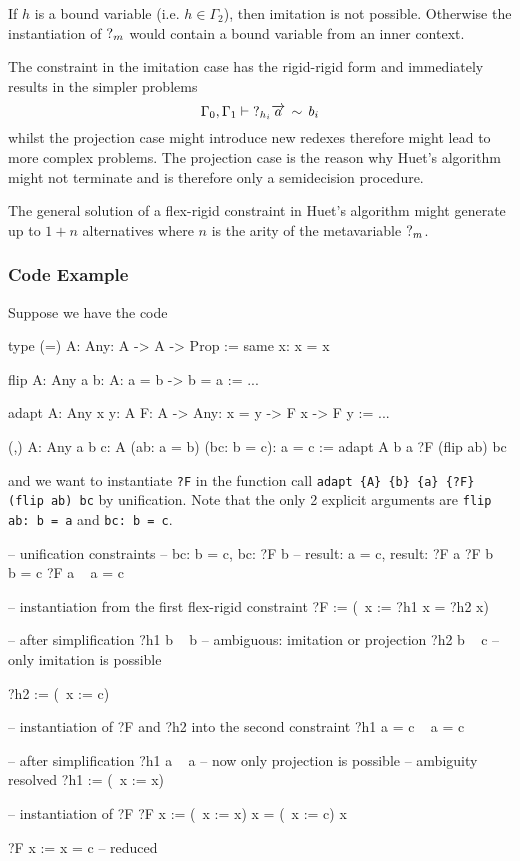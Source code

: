 If $h$ is a bound variable (i.e. $h\in \Gamma_2$), then imitation is not
possible. Otherwise the instantiation of ${?_{m}}$ would contain a bound
variable from an inner context.

The constraint in the imitation case has the rigid-rigid form and immediately
results in the simpler problems
$$
    \Gamma_0, \Gamma_1 \vdash {?_{h_i}} {\overrightarrow {a}} \, \sim \, b_i
$$
whilst the projection case might introduce new redexes therefore might lead to
more complex problems. The projection case is the reason why Huet's algorithm
might not terminate and is therefore only a semidecision procedure.

The general solution of a flex-rigid constraint in Huet's algorithm might
generate up to $1 + n$ alternatives where $n$ is the arity of the metavariable
${?_{m}}$.






\subsubsection{Code Example}

Suppose we have the code
\begin{alba}
    type (=) {A: Any}: A -> A -> Prop :=
        same {x}: x = x

    flip {A: Any} {a b: A}: a = b -> b = a :=
        ...

    adapt {A: Any} {x y: A} {F: A -> Any}: x = y -> F x -> F y :=
        ...

    (,) {A: Any} {a b c: A} (ab: a = b) (bc: b = c): a = c :=
        adapt {A} {b} {a} {?F} (flip ab) bc
\end{alba}
%
and we want to instantiate {\tt ?F} in the function call
{\tt adapt \{A\} \{b\} \{a\} \{?F\} (flip ab) bc}
by unification. Note that the only 2 explicit arguments are
{\tt flip ab: b = a} and {\tt bc: b = c}.

\begin{alba}
    -- unification constraints
    --    bc: b = c,      bc: ?F b
    --    result: a = c,  result: ?F a
    ?F b   ~   b = c
    ?F a   ~   a = c

    -- instantiation from the first flex-rigid constraint
    ?F := (\ x := ?h1 x = ?h2 x)

    -- after simplification
    ?h1 b  ~  b             -- ambiguous: imitation or projection
    ?h2 b  ~  c             -- only imitation is possible

    ?h2 := (\ x := c)

    -- instantiation of ?F and ?h2 into the second constraint
    ?h1 a = c    ~    a = c

    -- after simplification
    ?h1 a  ~  a             -- now only projection is possible
                            -- ambiguity resolved
    ?h1 := (\ x := x)

    -- instantiation of ?F
    ?F x := (\ x := x) x = (\ x := c) x

    ?F x := x = c   -- reduced
\end{alba}






